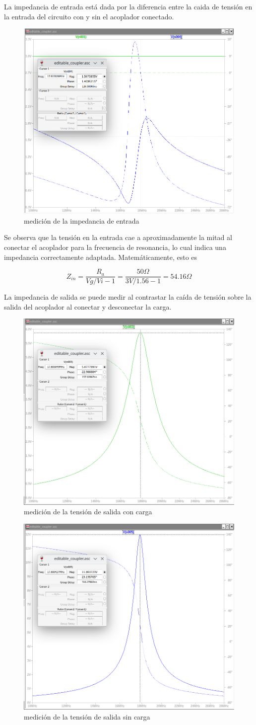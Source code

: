 La impedancia de entrada está dada por la diferencia entre la caida de tensión en la entrada del circuito con y sin el acoplador conectado.

\begin{figure}[H]
    \centering
    \includegraphics[width=0.5\linewidth]{fig/zin.png}
    \caption{medición de la impedancia de entrada}
    \label{fig:enter-label}
\end{figure}

Se observa que la tensión en la entrada cae a aproximadamente la mitad al conectar el acoplador para la frecuencia de resonancia, lo cual indica una impedancia correctamente adaptada. Matemáticamente, esto es

$$
Z_{in} = \frac{R_a}{Vg/Vi-1} = \frac{50\Omega}{3V/1.56-1} = 54.16\Omega
$$

La impedancia de salida se puede medir al contrastar la caída de tensión sobre la salida del acoplador al conectar y desconectar la carga.

\begin{figure}[H]
    \centering
    \includegraphics[width=0.5\linewidth]{fig/zo2.png}
    \caption{medición de la tensión de salida con carga}
    \label{fig:enter-label}
\end{figure}

\begin{figure}[H]
    \centering
    \includegraphics[width=0.5\linewidth]{fig/zout.png}
    \caption{medición de la tensión de salida sin carga}
    \label{fig:enter-label}
\end{figure}


